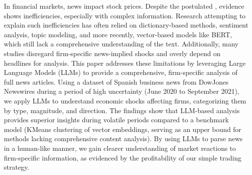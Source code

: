 In financial markets, news impact stock prices. Despite the postulated , evidence shows inefficiencies, especially with complex information. Research attempting to explain such inefficiencies has often relied on dictionary-based methods, sentiment analysis, topic modeling, and more recently, vector-based models like BERT, which still lack a comprehensive understanding of the text. Additionally, many studies disregard firm-specific news-implied shocks and overly depend on headlines for analysis. This paper addresses these limitations by leveraging Large Language Models (LLMs) to provide a comprehensive, firm-specific analysis of full news articles. 
Using a dataset of Spanish business news from DowJones Newswires during a period of high uncertainty (June 2020 to September 2021), we apply LLMs to understand economic shocks affecting firms, categorizing them by type, magnitude, and direction. The findings show that LLM-based analysis provides superior insights during volatile periods compared to a benchmark model (KMeans clustering of vector embeddings, serving as an upper bound for methods lacking comprehensive content analysis). By using LLMs to parse news in a human-like manner, we gain clearer understanding of market reactions to firm-specific information, as evidenced by the profitability of our simple trading strategy.

